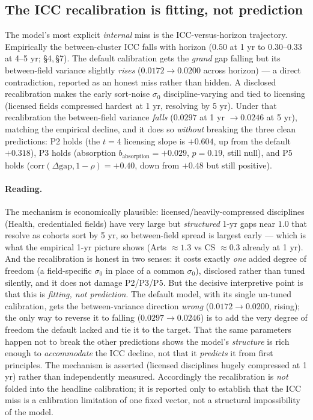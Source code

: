 \documentclass[11pt]{article}
\begin{document}
\subsection{The ICC recalibration is fitting, not prediction}

The model's most explicit \emph{internal} miss is the ICC-versus-horizon trajectory. Empirically the between-cluster ICC falls with horizon ($0.50$ at 1 yr to $0.30$--$0.33$ at 4--5 yr; \S4,\,\S7). The default calibration gets the \emph{grand} gap falling but its between-field variance slightly \emph{rises} ($0.0172\to0.0200$ across horizon) --- a direct contradiction, reported as an honest miss rather than hidden. A disclosed recalibration makes the early sort-noise $\sigma_0$ discipline-varying and tied to licensing (licensed fields compressed hardest at 1 yr, resolving by 5 yr). Under that recalibration the between-field variance \emph{falls} ($0.0297$ at 1 yr $\to 0.0246$ at 5 yr), matching the empirical decline, and it does so \emph{without} breaking the three clean predictions: P2 holds (the $t{=}4$ licensing slope is $+0.604$, up from the default $+0.318$), P3 holds (absorption $b_{\text{absorption}}=+0.029$, $p=0.19$, still null), and P5 holds ($\mathrm{corr}(\Delta\mathrm{gap},1-\rho)=+0.40$, down from $+0.48$ but still positive).

\paragraph{Reading.} The mechanism is economically plausible: licensed/heavily-compressed disciplines (Health, credentialed fields) have very large but \emph{structured} 1-yr gaps near $1.0$ that resolve as cohorts sort by 5 yr, so between-field spread is largest early --- which is what the empirical 1-yr picture shows (Arts $\approx 1.3$ vs CS $\approx 0.3$ already at 1 yr). And the recalibration is honest in two senses: it costs exactly \emph{one} added degree of freedom (a field-specific $\sigma_0$ in place of a common $\sigma_0$), disclosed rather than tuned silently, and it does not damage P2/P3/P5. But the decisive interpretive point is that this is \emph{fitting, not prediction}. The default model, with its single un-tuned calibration, gets the between-variance direction \emph{wrong} ($0.0172\to0.0200$, rising); the only way to reverse it to falling ($0.0297\to0.0246$) is to add the very degree of freedom the default lacked and tie it to the target. That the same parameters happen not to break the other predictions shows the model's \emph{structure} is rich enough to \emph{accommodate} the ICC decline, not that it \emph{predicts} it from first principles. The mechanism is asserted (licensed disciplines hugely compressed at 1 yr) rather than independently measured. Accordingly the recalibration is \emph{not} folded into the headline calibration; it is reported only to establish that the ICC miss is a calibration limitation of one fixed vector, not a structural impossibility of the model.
\end{document}
